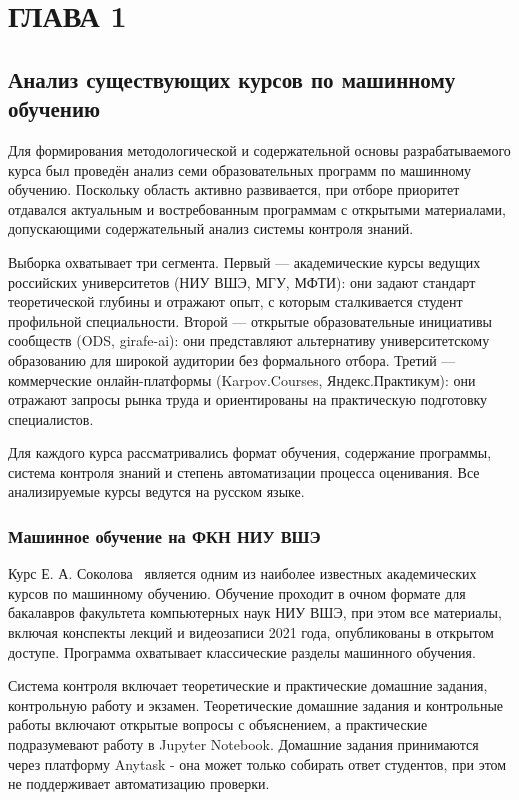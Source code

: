 \chapter*{ГЛАВА 1}
\sloppy

\section{Анализ существующих курсов по машинному обучению}\label{sec:course_analysis}

Для формирования методологической и содержательной основы разрабатываемого курса был проведён анализ семи образовательных программ по машинному обучению. Поскольку область активно развивается, при отборе приоритет отдавался актуальным и востребованным программам с открытыми материалами, допускающими содержательный анализ системы контроля знаний.

Выборка охватывает три сегмента. Первый --- академические курсы ведущих российских университетов (НИУ ВШЭ, МГУ, МФТИ): они задают стандарт теоретической глубины и отражают опыт, с которым сталкивается студент профильной специальности. Второй --- открытые образовательные инициативы сообществ (ODS, girafe-ai): они представляют альтернативу университетскому образованию для широкой аудитории без формального отбора. Третий --- коммерческие онлайн-платформы (Karpov.Courses, Яндекс.Практикум): они отражают запросы рынка труда и ориентированы на практическую подготовку специалистов.

Для каждого курса рассматривались формат обучения, содержание программы, система контроля знаний и степень автоматизации процесса оценивания. Все анализируемые курсы ведутся на русском языке.

\subsection{Машинное обучение на ФКН НИУ ВШЭ}

Курс Е. А. Соколова~\cite{sokolov_hse} является одним из наиболее известных академических курсов по машинному обучению. Обучение проходит в очном формате для бакалавров факультета компьютерных наук НИУ ВШЭ, при этом все материалы, включая конспекты лекций и видеозаписи 2021 года, опубликованы в открытом доступе. Программа охватывает классические разделы машинного обучения.

Система контроля включает теоретические и практические домашние задания, контрольную работу и экзамен. Теоретические домашние задания и контрольные работы включают открытые вопросы с объяснением, а практические подразумевают работу в Jupyter Notebook. Домашние задания принимаются через платформу Anytask - она может только собирать ответ студентов, при этом не поддерживает автоматизацию проверки.

